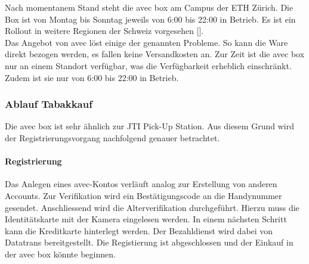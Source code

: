  Nach momentanem Stand steht die avec box am Campus der ETH Zürich. Die Box ist von Montag bis Sonntag jeweils von 6:00 bis 22:00 in Betrieb. Es ist ein Rollout in weitere Regionen der Schweiz vorgesehen [\cite{avecBoxStand}].\\
 Das Angebot von avec löst einige der genannten Probleme. So kann die Ware direkt bezogen werden, es fallen keine Versandkosten an. Zur Zeit ist die avec box nur an einem Standort verfügbar, was die Verfügbarkeit erheblich einschränkt. Zudem ist sie nur von 6:00 bis 22:00 in Betrieb. 
 
\subsubsection{Ablauf Tabakkauf}
Die avec box ist sehr ähnlich zur JTI Pick-Up Station. Aus diesem Grund wird der Registrierungsvorgang nachfolgend genauer betrachtet. 
\paragraph{Registrierung}
Das Anlegen eines avec-Kontos verläuft analog zur Erstellung von anderen Accounts. Zur Verifikation wird ein Bestätigungscode an die Handynummer gesendet. Anschliessend wird die Alterverifikation durchgeführt. Hierzu muss die Identitätskarte mit der Kamera eingelesen werden. In einem nächsten Schritt kann die Kreditkarte hinterlegt werden. Der Bezahldienst wird dabei von Datatrans bereitgestellt. Die Registierung ist abgeschlossen und der Einkauf in der avec box könnte beginnen. \\

